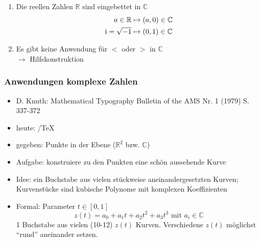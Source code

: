 \begin{note}\flush
  \begin{enumerate}
    \item Die reellen Zahlen $\mathbb{R}$ sind eingebettet in $\mathbb{C}$
      \begin{align*}
      a \in \mathbb{R} & \mapsto (a, 0) \in \mathbb{C}\\
      \operatorname{i} = \sqrt{-1} & \mapsto (0, 1)  \in \mathbb{C}
      \end{align*}
    \item Es gibt keine Anwendung für $<$ oder $>$ in $\mathbb{C}$\\ $\rightarrow$ Hilfskonstruktion
  \end{enumerate}
\end{note}

\subsubsection*{Anwendungen komplexe Zahlen}
\begin{itemize}
  \item D. Knuth: Mathematical Typography Bulletin of the AMS Nr. 1 (1979) S. 337-372
  \item heute: \MF/\TeX{}
  \item gegeben: Punkte in der Ebene ($\mathbb{R}^2$ bzw. $\mathbb{C}$)
  \item Aufgabe: konstruiere zu den Punkten eine schön aussehende Kurve
  \item Idee: ein Buchstabe aus vielen stückweise aneinandergesetzten Kurven; Kurvenstücke sind kubische Polynome mit komplexen Koeffizienten
  \item Formal: Parameter $ t \in [0,1] $ \\
    \begin{equation*}z(t) = a_0 + a_1 t + a_2 t^2 + a_3 t^3 \text{ mit }  a_i \in \mathbb{C}\end{equation*}
    1 Buchstabe aus vielen (10-12) $z(t)$ Kurven. Verschiedene $z(t)$ möglichst "`rund"' aneinander setzen.
\end{itemize}


